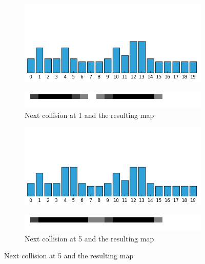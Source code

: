 \begin{exmp}
\begin{figure}
\begin{minipage}{0.48\textwidth}
\centering
\begin{subfigure}{\textwidth}
\centering
\includegraphics[scale=0.4]{./images/ex24/ex24coll1.png}
\end{subfigure}
\begin{subfigure}{\textwidth}
\centering
\includegraphics[scale=0.4]{./images/ex24/ex24wall1.png}
\caption{Next collision at 1 and the resulting map}
\end{subfigure}
\end{minipage}
\begin{minipage}{0.48\textwidth}
\centering
\begin{subfigure}{\textwidth}
\centering
\includegraphics[scale=0.4]{./images/ex24/ex24coll5.png}
\end{subfigure}
\begin{subfigure}{\textwidth}
\centering
\includegraphics[scale=0.4]{./images/ex24/ex24wall5.png}
\caption{Next collision at 5 and the resulting map}
\end{subfigure}
\end{minipage}


\end{figure}
\end{exmp}

